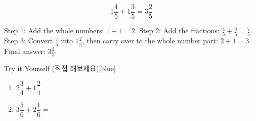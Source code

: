 \documentclass[12pt]{book}
\begin{document}
\[
1 \dfrac{4}{5} + 1 \dfrac{3}{5} = 3 \dfrac{2}{5}
\]

Step 1: Add the whole numbers: $1+1=2$.  
Step 2: Add the fractions: $\tfrac{4}{5}+\tfrac{3}{5}=\tfrac{7}{5}$.  
Step 3: Convert $\tfrac{7}{5}$ into $1 \tfrac{2}{5}$, then carry over to the whole number part: $2+1=3$.  
Final answer: $3 \tfrac{2}{5}$.   


\begin{flexbox}{Try it Yourself (직접 해보세요)}[blue]
\begin{enumerate}
  \item $2 \dfrac{3}{4}+1 \dfrac{2}{4}=$ \vspace*{20pt}
  \item $3 \dfrac{5}{6}+2 \dfrac{1}{6}=$ \vspace*{20pt}
\end{enumerate}
\end{flexbox}



\end{document}
